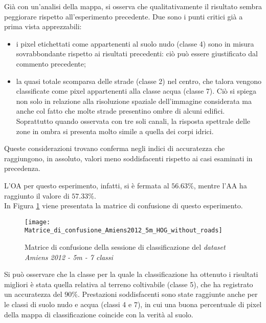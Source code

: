 Già con un'analisi della mappa, si osserva che qualitativamente il
risultato sembra peggiorare rispetto all'esperimento precedente. Due
sono i punti critici già a prima vista apprezzabili:

\begin{itemize}

\item i pixel etichettati come appartenenti al suolo nudo (classe 4)
sono in misura sovrabbondante rispetto ai risultati precedenti: ciò
può essere giustificato dal commento precedente;

\item la quasi totale scomparsa delle strade (classe 2) nel centro,
che talora vengono classificate come pixel appartenenti alla classe
acqua (classe 7). Ciò si spiega non solo in relazione alla risoluzione
spaziale dell'immagine considerata ma anche col fatto che molte strade
presentino ombre di alcuni edifici. Soprattutto quando osservata con
tre soli canali, la risposta spettrale delle zone in ombra si presenta
molto simile a quella dei corpi idrici.

\end{itemize}

Queste considerazioni trovano conferma negli indici di accuratezza che
raggiungono, in assoluto, valori meno soddisfacenti rispetto ai casi
esaminati in precedenza.

L'OA per questo esperimento, infatti, si è fermata al $56.63\%$,
mentre l'AA ha raggiunto il valore di $57.33\%$.\\

In Figura \ref{fig:Matrice_di_confusione_Amiens2012_5m_HOG_without_roads}
viene presentata la matrice di confusione di questo esperimento. \\

\begin{figure}[!ht]

\texttt{[image: Matrice\_di\_confusione\_Amiens2012\_5m\_HOG\_without\_roads]}

\caption{Matrice di confusione della sessione di classificazione del
\emph{dataset} \emph{Amiens 2012 - 5m - 7 classi}}

\label{fig:Matrice_di_confusione_Amiens2012_5m_HOG_without_roads}
\end{figure}

Si può osservare che la classe per la quale la classificazione ha
ottenuto i risultati migliori è stata quella relativa al terreno
coltivabile (classe 5), che ha registrato un accuratezza del $90\%$.
Prestazioni soddisfacenti sono state raggiunte anche per le classi di
suolo nudo e acqua (classi 4 e 7), in cui una buona percentuale di
pixel della mappa di classificazione coincide con la verità al
suolo.\\

